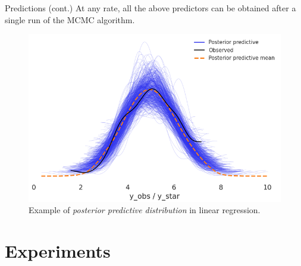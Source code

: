 \documentclass[10pt, english, professionalfonts]{beamer}
\begin{document}
\begin{frame}{Predictions (cont.)}
    At any rate, all the above predictors can be obtained after a single run of the MCMC algorithm.
  \begin{figure}
    \includegraphics[width=.75\textwidth]{img/ppc_lin_standalone}
    \caption{Example of \textit{posterior predictive distribution} in linear regression.}
  \end{figure}
\end{frame}


\section{Experiments}

%
\end{document}

